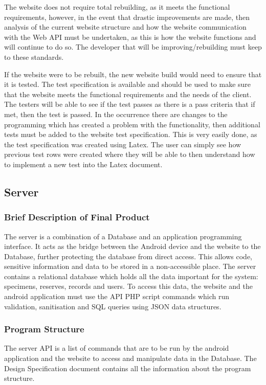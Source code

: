         The website does not require total rebuilding, as it meets the functional requirements, however, in the event that drastic improvements are made, then analysis of the current website structure and how the website communication with the Web API must be undertaken, as this is how the website functions and will continue to do so. The developer that will be improving/rebuilding must keep to these standards.
    
        If the website were to be rebuilt, the new website build would need to ensure that it is tested. The test specification is available and should be used to make sure that the website meets the functional requirements and the needs of the client. The testers will be able to see if the test passes as there is a pass criteria that if met, then the test is passed. In the occurrence there are changes to the programming which has created a problem with the functionality, then additional tests must be added to the website test specification. This is very easily done, as the test specification was created using Latex. The user can simply see how previous test rows were created where they will be able to then understand how to implement a new test into the Latex document. 

\subsection{Server}
    \subsubsection{Brief Description of Final Product}
        The server is a combination of a Database and an application programming interface. It acts as the bridge between the Android device and the website to the Database, further protecting the database from direct access. This allows code, sensitive information and data to be stored in a non-accessible place. The server contains a relational database which holds all the data important for the system: specimens, reserves, records and users. To access this data, the website and the android application must use the API PHP script commands which run validation, sanitisation and SQL queries using JSON data structures. 

    \subsubsection{Program Structure}
        The server API is a list of commands that are to be run by the android application and the website to access and manipulate data in the Database. The Design Specification document contains all the information about the program structure.

